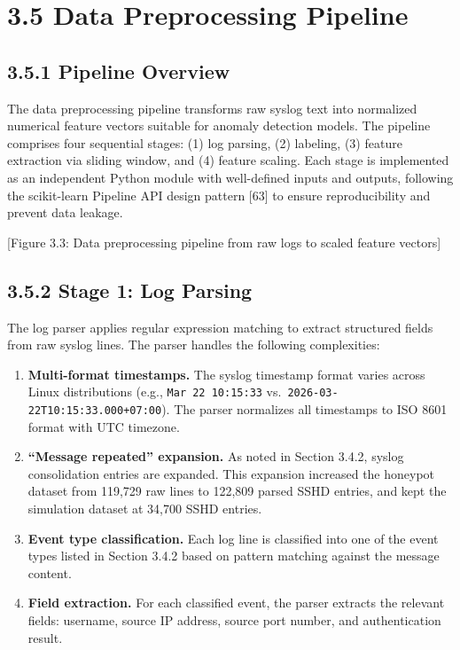 \documentclass[
  a4paper]{report}
\begin{document}
\section{3.5 Data Preprocessing
Pipeline}\label{data-preprocessing-pipeline}

\subsection{3.5.1 Pipeline Overview}\label{pipeline-overview}

The data preprocessing pipeline transforms raw syslog text into
normalized numerical feature vectors suitable for anomaly detection
models. The pipeline comprises four sequential stages: (1) log parsing,
(2) labeling, (3) feature extraction via sliding window, and (4) feature
scaling. Each stage is implemented as an independent Python module with
well-defined inputs and outputs, following the scikit-learn Pipeline API
design pattern {[}63{]} to ensure reproducibility and prevent data
leakage.

{[}Figure 3.3: Data preprocessing pipeline from raw logs to scaled
feature vectors{]}

\subsection{3.5.2 Stage 1: Log Parsing}\label{stage-1-log-parsing}

The log parser applies regular expression matching to extract structured
fields from raw syslog lines. The parser handles the following
complexities:

\begin{enumerate}
\def\labelenumi{\arabic{enumi}.}
\item
  \textbf{Multi-format timestamps.} The syslog timestamp format varies
  across Linux distributions (e.g., \texttt{Mar\ 22\ 10:15:33}
  vs.~\texttt{2026-03-22T10:15:33.000+07:00}). The parser normalizes all
  timestamps to ISO 8601 format with UTC timezone.
\item
  \textbf{``Message repeated'' expansion.} As noted in Section 3.4.2,
  syslog consolidation entries are expanded. This expansion increased
  the honeypot dataset from 119,729 raw lines to 122,809 parsed SSHD
  entries, and kept the simulation dataset at 34,700 SSHD entries.
\item
  \textbf{Event type classification.} Each log line is classified into
  one of the event types listed in Section 3.4.2 based on pattern
  matching against the message content.
\item
  \textbf{Field extraction.} For each classified event, the parser
  extracts the relevant fields: username, source IP address, source port
  number, and authentication result.
\end{enumerate}
\end{document}
